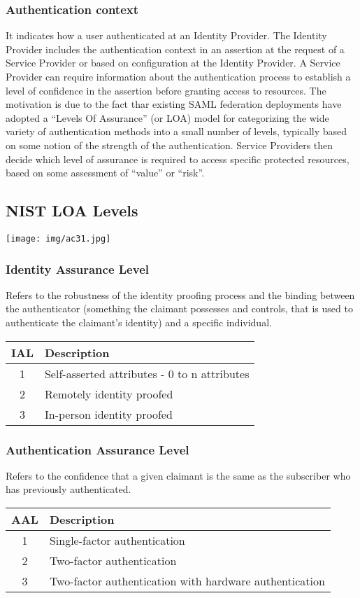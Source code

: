 \documentclass[a4paper, 10pt, titlepage]{article}
\begin{document}
\subsubsection*{Authentication context}
It indicates how a user authenticated at an Identity Provider. The Identity Provider includes the authentication context in an assertion at the request of a Service Provider or based on configuration at the Identity Provider. A Service Provider can require information about the authentication process to establish a level of confidence in the assertion before granting access to resources.
The motivation is due to the fact thar existing SAML federation deployments have adopted a “Levels Of Assurance” (or LOA) model for categorizing the wide variety of authentication methods into a small number of levels, typically based on some notion of the strength of the authentication. Service Providers then decide which level of assurance is required to access specific protected resources, based on some assessment of “value” or “risk”.

\subsection*{NIST LOA Levels}
\begin{center}
\texttt{[image: img/ac31.jpg]}
\end{center}

\subsubsection*{Identity Assurance Level}
Refers to the robustness of the identity proofing process and the binding between the authenticator (something the claimant possesses and controls, that is used to authenticate the claimant’s identity) and a specific individual.
\begin{center}
\begin{tabular}{|c|l|} \hline
IAL & Description \\ \hline
1 & Self-asserted attributes - 0 to n attributes \\
2 & Remotely identity proofed\\
3 & In-person identity proofed\\ \hline
\end{tabular}
\end{center}
\subsubsection*{Authentication Assurance Level}
Refers to the confidence that a given claimant is the same as the subscriber who has previously authenticated.
\begin{center}
\begin{tabular}{|c|l|} \hline
AAL & Description \\ \hline
1 & Single-factor authentication\\
2 & Two-factor authentication\\
3 & Two-factor authentication with hardware authentication\\ \hline
\end{tabular}
\end{center}
\end{document}
